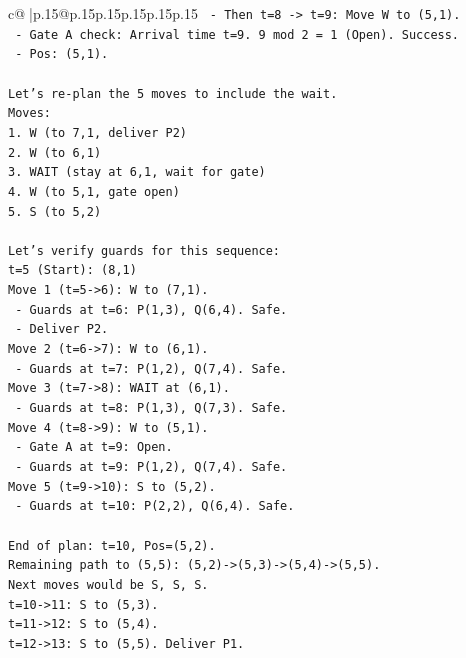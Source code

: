 \documentclass{article}
\begin{document}
{\begin{supertabular}{c@{$\;$}|p{.15\linewidth}@{}p{.15\linewidth}p{.15\linewidth}p{.15\linewidth}p{.15\linewidth}p{.15\linewidth}}
{{{\texttt{    {-} Then t=8 {-}> t=9: Move W to (5,1).} \\
\texttt{      {-} Gate A check: Arrival time t=9. 9 mod 2 = 1 (Open). Success.} \\
\texttt{      {-} Pos: (5,1).} \\
\\ 
\texttt{Let's re{-}plan the 5 moves to include the wait.} \\
\texttt{Moves:} \\
\texttt{1. W (to 7,1, deliver P2)} \\
\texttt{2. W (to 6,1)} \\
\texttt{3. WAIT (stay at 6,1, wait for gate)} \\
\texttt{4. W (to 5,1, gate open)} \\
\texttt{5. S (to 5,2)} \\
\\ 
\texttt{Let's verify guards for this sequence:} \\
\texttt{t=5 (Start): (8,1)} \\
\texttt{Move 1 (t=5{-}>6): W to (7,1).} \\
\texttt{  {-} Guards at t=6: P(1,3), Q(6,4). Safe.} \\
\texttt{  {-} Deliver P2.} \\
\texttt{Move 2 (t=6{-}>7): W to (6,1).} \\
\texttt{  {-} Guards at t=7: P(1,2), Q(7,4). Safe.} \\
\texttt{Move 3 (t=7{-}>8): WAIT at (6,1).} \\
\texttt{  {-} Guards at t=8: P(1,3), Q(7,3). Safe.} \\
\texttt{Move 4 (t=8{-}>9): W to (5,1).} \\
\texttt{  {-} Gate A at t=9: Open.} \\
\texttt{  {-} Guards at t=9: P(1,2), Q(7,4). Safe.} \\
\texttt{Move 5 (t=9{-}>10): S to (5,2).} \\
\texttt{  {-} Guards at t=10: P(2,2), Q(6,4). Safe.} \\
\\ 
\texttt{End of plan: t=10, Pos=(5,2).} \\
\texttt{Remaining path to (5,5): (5,2){-}>(5,3){-}>(5,4){-}>(5,5).} \\
\texttt{Next moves would be S, S, S.} \\
\texttt{t=10{-}>11: S to (5,3).} \\
\texttt{t=11{-}>12: S to (5,4).} \\
\texttt{t=12{-}>13: S to (5,5). Deliver P1.} \\
}}}
\end{supertabular}}
\end{document}
